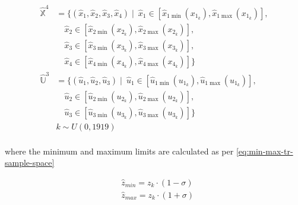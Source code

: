 \begin{equation}\label{eq:TR-sample-space}
	\begin{split}
		\hat{\mathbb{X}}^4 &= \{ (\hat{x}_1, \hat{x}_2, \hat{x}_3, \hat{x}_4) \mid\ \hat{x}_1 \in [\hat{x}_{1\min}(x_{1_k}), \hat{x}_{1\max}(x_{1_k})], \\
		&\quad \hat{x}_2 \in [\hat{x}_{2\min}(x_{2_k}), \hat{x}_{2\max}(x_{2_k})], \\
		&\quad \hat{x}_3 \in [\hat{x}_{3\min}(x_{3_k}), \hat{x}_{3\max}(x_{3_k})], \\
		&\quad \hat{x}_4 \in [\hat{x}_{4\min}(x_{4_k}), \hat{x}_{4\max}(x_{4_k})] \} \\
		\hat{\mathbb{U}}^3 &= \{ (\hat{u}_1, \hat{u}_2, \hat{u}_3) \mid\ \hat{u}_1 \in [\hat{u}_{1\min}(u_{1_k}), \hat{u}_{1\max}(u_{1_k})], \\
		&\quad \hat{u}_2 \in [\hat{u}_{2\min}(u_{2_k}), \hat{u}_{2\max}(u_{2_k})], \\
		&\quad \hat{u}_3 \in [\hat{u}_{3\min}(u_{3_k}), \hat{u}_{3\max}(u_{3_k})] \} \\
		& k \sim U(0,1919)  \\
	\end{split}
\end{equation}

where the minimum and maximum limits are calculated as per \autoref{eq:min-max-tr-sample-space}

\begin{equation}\label{eq:min-max-tr-sample-space}
	\begin{aligned}
		&\hat{z}_{min} = z_k \cdot (1-\sigma)\\
		&\hat{z}_{max} = z_k \cdot (1+\sigma)
	\end{aligned}
\end{equation}

